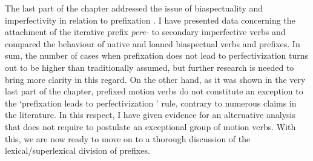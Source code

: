 The last part of the chapter addressed the issue of biaspectuality and imperfectivity in relation to prefixation . I have presented data concerning the attachment of the iterative prefix \textit{pere-}   to secondary imperfective  verbs  and compared the behaviour of native and loaned   biaspectual verbs   and prefixes. In sum, the number of cases when prefixation  does not lead to perfectivization  turns out to be higher than traditionally assumed, but further research is needed to bring more clarity in this regard. On the other hand, as it was shown in the very last part of the chapter, prefixed motion verbs do not constitute an exception to the `prefixation  leads to perfectivization ' rule, contrary to numerous claims in the literature. In this respect, I have given evidence for an alternative analysis that does not require to postulate an exceptional group of motion verbs. With this, we are now ready to move on to a thorough discussion of the lexical/superlexical division of prefixes.

